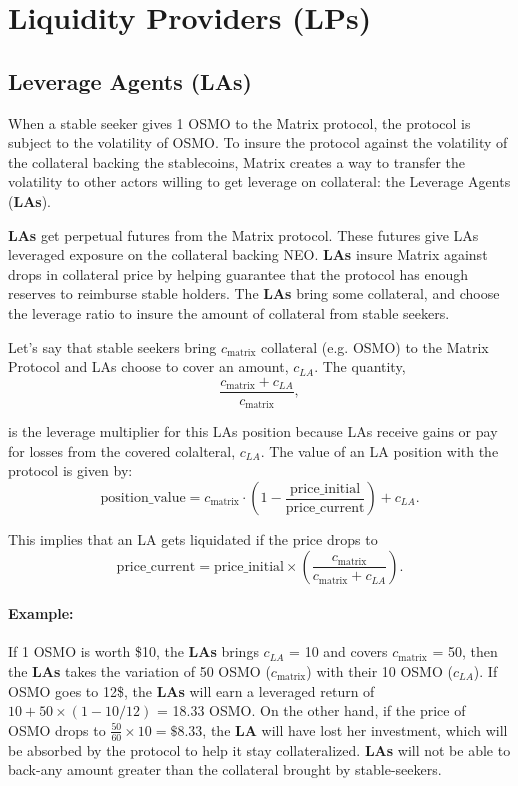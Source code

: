 \documentclass[%
 reprint,
nofootinbib,
 amsmath,amssymb,
 aps,
]{revtex4-2}
\begin{document}
\section{Liquidity Providers (\textbf{LPs})}\label{Section3}

\subsection{Leverage Agents (\textbf{LAs})}

When a stable seeker gives 1 OSMO to the Matrix protocol, the protocol is subject to the volatility of OSMO. To insure the protocol against the volatility of the collateral backing the stablecoins, Matrix creates a way to transfer the volatility to other actors willing to get leverage on collateral: the Leverage Agents (\textbf{LAs}). 

\textbf{LAs} get perpetual futures from the Matrix protocol. These futures give LAs leveraged exposure on the collateral backing NEO. \textbf{LAs} insure Matrix against drops in collateral price by helping guarantee that the protocol has enough reserves to reimburse stable holders. The \textbf{LAs} bring some collateral, and choose the leverage ratio to insure the amount of collateral from stable seekers. 

Let's say that stable seekers bring $c_{\text{matrix}}$ collateral (e.g. OSMO) to the Matrix Protocol and LAs choose to cover an amount, $c_{LA}$. The quantity,
$$ \frac{ c_{\text{matrix}} + c_{LA} }{ c_{\text{matrix}} } ,$$

is the leverage multiplier for this LAs position because LAs receive gains or pay for losses from the covered colalteral, $c_{LA}$. The value of an LA position with the protocol is given by: 
$$ 
\text{position\_value} = c_{\text{matrix}}\cdot \left( 1 - \frac{\text{price\_initial}}{\text{price\_current}}  \right) + c_{LA}.
$$

This implies that an LA gets liquidated if the price drops to 
$$
\text{price\_current} =  \text{price\_initial} \times \left(\frac{ c_{\text{matrix}} }{ c_{\text{matrix}} + c_{LA} }\right).
$$

\paragraph*{Example:} 
If 1 OSMO is worth \$10, the \textbf{LAs} brings $c_{LA}$ = 10 and covers $c_{\text{matrix}}$ = 50, then the \textbf{LAs} takes the variation of 50 OSMO ($c_{\text{matrix}}$) with their 10 OSMO ($c_{LA}$). If OSMO goes to 12\$, the \textbf{LAs} will earn a leveraged return of $10 + 50 \times (1 - 10/12)$ = 18.33 OSMO. On the other hand, if the price of OSMO drops to $\frac{50}{60} \times 10 = \$8.33$, the \textbf{LA} will have lost her investment, which will be absorbed by the protocol to help it stay collateralized. \textbf{LAs} will not be able to back-any amount greater than the collateral brought by stable-seekers.
\end{document}
